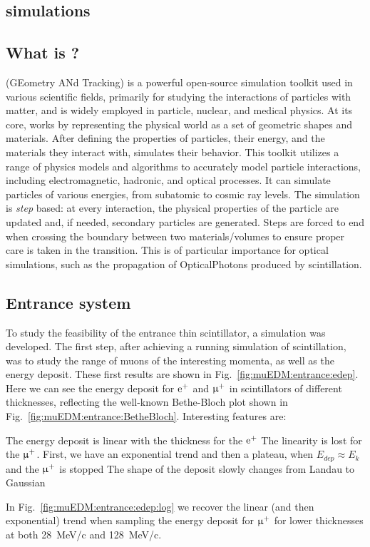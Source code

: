 \begin{refsection}
\section{\gf simulations}
    \label{sec:muEDM:entrance:sim}
    \subsection{What is \gf?}
        \gf (GEometry ANd Tracking) is a powerful open-source simulation toolkit used in various scientific fields, primarily for studying the interactions of particles with matter, and is widely employed in particle, nuclear, and medical physics. 
        At its core, \gf works by representing the physical world as a set of geometric shapes and materials. 
        After defining the properties of particles, their energy, and the materials they interact with, \gf simulates their behavior. 
        This toolkit utilizes a range of physics models and algorithms to accurately model particle interactions, including electromagnetic, hadronic, and optical processes. It can simulate particles of various energies, from subatomic to cosmic ray levels.
        The simulation is \textit{step} based: at every interaction, the physical properties of the particle are updated and, if needed, secondary particles are generated. 
        Steps are forced to end when crossing the boundary between two materials/volumes to ensure proper care is taken in the transition. 
        This is of particular importance for optical simulations, such as the propagation of OpticalPhotons produced by scintillation.

    \subsection{Entrance system}
        To study the feasibility of the entrance thin scintillator, a \gf simulation was developed.
        The first step, after achieving a running simulation of scintillation, was to study the range of muons of the interesting momenta, as well as the energy deposit. 
        These first results are shown in Fig.~\ref{fig:muEDM:entrance:edep}.
        Here we can see the energy deposit for $\text{e}^+$ and $\upmu^+$ in scintillators of different thicknesses, reflecting the well-known Bethe-Bloch plot shown in Fig.~\ref{fig:muEDM:entrance:BetheBloch}. 
        Interesting features are:
        \begin{outline}
            \1 The energy deposit is linear with the thickness for the $\text{e}^+$
            \1 The linearity is lost for the $\upmu^+$. First, we have an exponential trend and then a plateau, when $E_{dep}\approx E_k$ and the $\upmu^+$ is stopped
            \1 The shape of the deposit slowly changes from Landau to Gaussian
        \end{outline}
        In Fig.~\ref{fig:muEDM:entrance:edep:log} we recover the linear (and then exponential) trend when sampling the energy deposit for $\upmu^+$ for lower thicknesses at both \SI{28}{MeV/c} and \SI{128}{MeV/c}.



\end{refsection}
